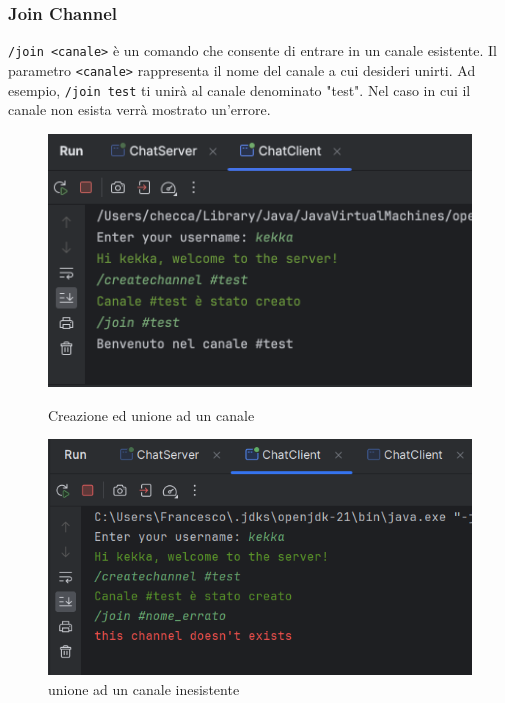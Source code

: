 \subsubsection{Join Channel}
\texttt{/join <canale>} è un comando che consente di entrare in un canale esistente. Il parametro \texttt{<canale>} rappresenta il nome del canale a cui desideri unirti. Ad esempio, \texttt{/join test} ti unirà al canale denominato "test". Nel caso in cui il canale non esista verrà mostrato un'errore.
\begin{figure}[h]
  \centering
  \begin{minipage}{0.45\textwidth}
    \includegraphics[width=\linewidth]{imagens/outputs/3.png}
    \caption{Creazione ed unione ad un canale}
  \end{minipage}\hfill
  \begin{minipage}{0.45\textwidth}
    \includegraphics[width=\linewidth]{imagens/outputs/3_2.png}
    \caption{unione ad un canale inesistente}
  \end{minipage}\hfill
\end{figure}

